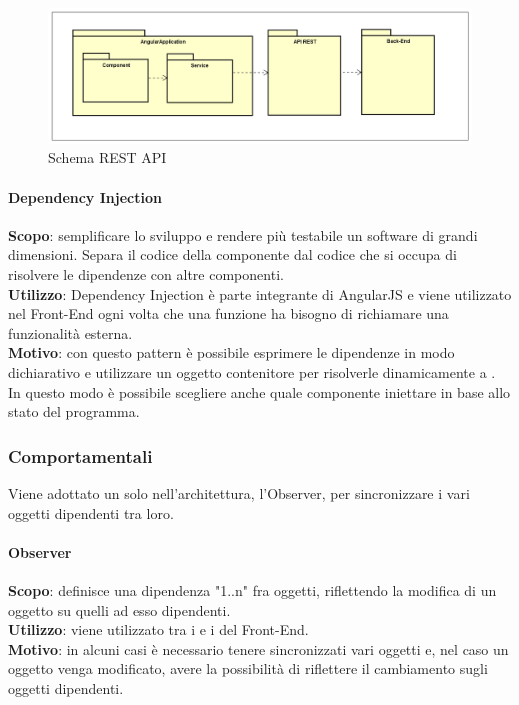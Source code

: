 \documentclass[../DefinizioneDiProdotto.tex]{subfiles}
\begin{document}
			\begin{figure}[!h]
			\centering
				\includegraphics[width=\textwidth]{Architettura/API-Rest.png}
				\caption{Schema REST API}
			\end{figure}

			\paragraph{Dependency Injection}\mbox{}
			\begin{addmargin}[1em]{2em}%
				\textbf{Scopo}: semplificare lo sviluppo e rendere più testabile un software di grandi dimensioni. Separa il codice della componente dal codice che si occupa di risolvere le dipendenze con altre componenti.\\
				\textbf{Utilizzo}: Dependency Injection è parte integrante di AngularJS e viene utilizzato nel Front-End ogni volta che una funzione ha bisogno di richiamare una funzionalità esterna.\\
				\textbf{Motivo}: con questo pattern è possibile esprimere le dipendenze in modo dichiarativo e utilizzare un oggetto contenitore per risolverle dinamicamente a . In questo modo è possibile scegliere anche quale componente iniettare in base allo stato del programma.
			\end{addmargin}

		\subsubsection{Comportamentali}
		Viene adottato un solo  nell'architettura, l'Observer, per sincronizzare i vari oggetti dipendenti tra loro.

			\paragraph{Observer}\mbox{}
			\begin{addmargin}[1em]{2em}%
				\textbf{Scopo}: definisce una dipendenza "1..n" fra oggetti, riflettendo la modifica di un oggetto su quelli ad esso dipendenti.\\
				\textbf{Utilizzo}: viene utilizzato tra i  e i  del Front-End.\\
				\textbf{Motivo}: in alcuni casi è necessario tenere sincronizzati vari oggetti e, nel caso un oggetto venga modificato, avere la possibilità di riflettere il cambiamento sugli oggetti dipendenti.
			\end{addmargin}
\end{document}
